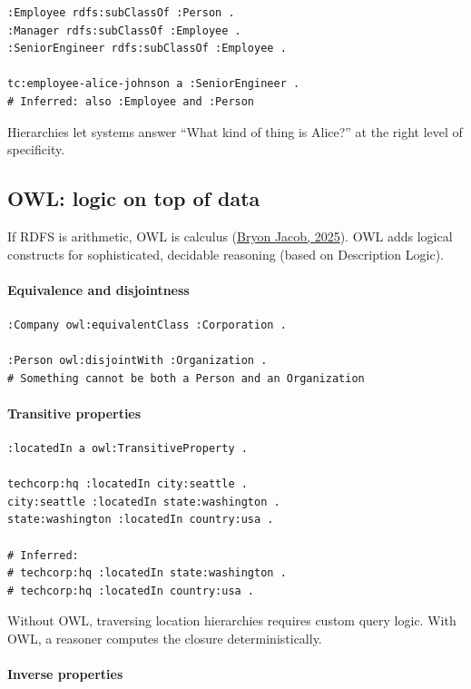 \begin{verbatim}
:Employee rdfs:subClassOf :Person .
:Manager rdfs:subClassOf :Employee .
:SeniorEngineer rdfs:subClassOf :Employee .

tc:employee-alice-johnson a :SeniorEngineer .
# Inferred: also :Employee and :Person
\end{verbatim}

Hierarchies let systems answer ``What kind of thing is Alice?'' at the right level
of specificity.

\subsection{OWL: logic on top of data}

If RDFS is arithmetic, OWL is calculus
(\href{https://bryon.io/from-facts-to-knowledge-the-layer-cake-of-rdfs-and-owl-e84819d8075d}{Bryon Jacob, 2025}).
OWL adds logical constructs for sophisticated, decidable reasoning (based on Description Logic).

\paragraph{Equivalence and disjointness}

\begin{verbatim}
:Company owl:equivalentClass :Corporation .

:Person owl:disjointWith :Organization .
# Something cannot be both a Person and an Organization
\end{verbatim}

\paragraph{Transitive properties}

\begin{verbatim}
:locatedIn a owl:TransitiveProperty .

techcorp:hq :locatedIn city:seattle .
city:seattle :locatedIn state:washington .
state:washington :locatedIn country:usa .

# Inferred:
# techcorp:hq :locatedIn state:washington .
# techcorp:hq :locatedIn country:usa .
\end{verbatim}

Without OWL, traversing location hierarchies requires custom query logic. With OWL,
a reasoner computes the closure deterministically.

\paragraph{Inverse properties}

